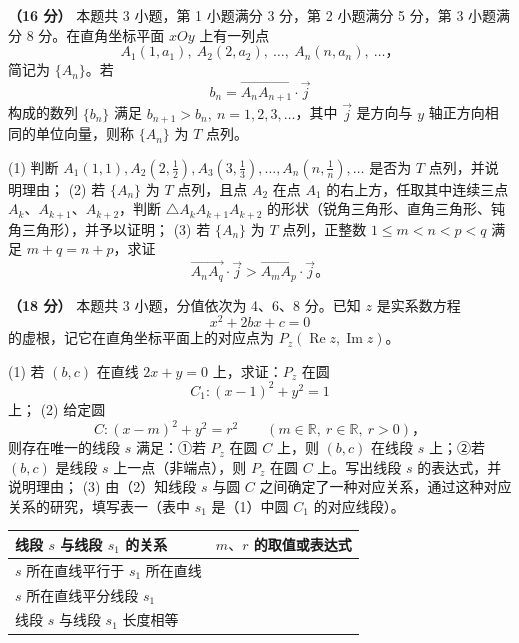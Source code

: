 \begin{question}
\textbf{（16 分）} 本题共 3 小题，第 1 小题满分 3 分，第 2 小题满分 5 分，第 3 小题满分 8 分。在直角坐标平面 \(xOy\) 上有一列点
\nopagebreak[4]
\[
A_1(1,a_1),\ A_2(2,a_2),\ \ldots,\ A_n(n,a_n),\ \ldots\text{，}
\]
简记为 \(\{A_n\}\)。若
\nopagebreak[4]
\[
b_n=\overrightarrow{A_nA_{n+1}}\cdot\vec j
\]
构成的数列 \(\{b_n\}\) 满足 \(b_{n+1}>b_n,\ n=1,2,3,\ldots\)，其中 \(\vec j\) 是方向与 \(y\) 轴正方向相同的单位向量，则称 \(\{A_n\}\) 为 \(T\) 点列。

(1) 判断 \(A_1(1,1), A_2(2,\frac12), A_3(3,\frac13),\ldots,A_n(n,\frac1n),\ldots\) 是否为 \(T\) 点列，并说明理由；
(2) 若 \(\{A_n\}\) 为 \(T\) 点列，且点 \(A_2\) 在点 \(A_1\) 的右上方，任取其中连续三点 \(A_k\text{、}A_{k+1}\text{、}A_{k+2}\)，判断 \(\triangle A_kA_{k+1}A_{k+2}\) 的形状（锐角三角形、直角三角形、钝角三角形），并予以证明；
(3) 若 \(\{A_n\}\) 为 \(T\) 点列，正整数 \(1\le m<n<p<q\) 满足 \(m+q=n+p\)，求证
\nopagebreak[4]
\[
   \overrightarrow{A_nA_q}\cdot\vec j>\overrightarrow{A_mA_p}\cdot\vec j\text{。}
\]

\end{question}
\begin{question}
\textbf{（18 分）} 本题共 3 小题，分值依次为 4、6、8 分。已知 \(z\) 是实系数方程
\nopagebreak[4]
\[
x^2+2bx+c=0
\]
的虚根，记它在直角坐标平面上的对应点为 \(P_z(\operatorname{Re}z,\operatorname{Im}z)\)。

(1) 若 \((b,c)\) 在直线 \(2x+y=0\) 上，求证：\(P_z\) 在圆
\nopagebreak[4]
\[
   C_1:(x-1)^2+y^2=1
\]
   上；
(2) 给定圆
\nopagebreak[4]
\[
   C:(x-m)^2+y^2=r^2\qquad(m\in\mathbb R,\ r\in\mathbb R,\ r>0)\text{，}
\]
   则存在唯一的线段 \(s\) 满足：①若 \(P_z\) 在圆 \(C\) 上，则 \((b,c)\) 在线段 \(s\) 上；②若 \((b,c)\) 是线段 \(s\) 上一点（非端点），则 \(P_z\) 在圆 \(C\) 上。写出线段 \(s\) 的表达式，并说明理由；
(3) 由（2）知线段 \(s\) 与圆 \(C\) 之间确定了一种对应关系，通过这种对应关系的研究，填写表一（表中 \(s_1\) 是（1）中圆 \(C_1\) 的对应线段）。

\begin{center}
\begin{tabular}{ll}
\toprule
线段 \(s\) 与线段 \(s_1\) 的关系 & \(m\text{、}r\) 的取值或表达式 \\
\midrule
\(s\) 所在直线平行于 \(s_1\) 所在直线 &  \\
\(s\) 所在直线平分线段 \(s_1\) &  \\
线段 \(s\) 与线段 \(s_1\) 长度相等 &  \\
\bottomrule
\end{tabular}
\end{center}

\end{question}